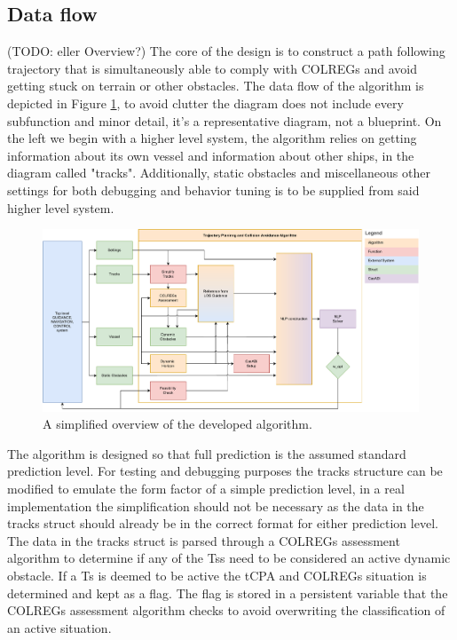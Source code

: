 \subsection{Data flow} (TODO: eller Overview?)
The core of the design is to construct a path following trajectory that is simultaneously able to comply with \gls{COLREGs} and avoid getting stuck
on terrain or other obstacles. The data flow of the algorithm is depicted in Figure \ref{FIG: Dataflow chart}, 
to avoid clutter the diagram does not include every subfunction and minor detail, it's a
representative diagram, not a blueprint. On the left we begin with a higher level system, the algorithm
relies on getting information about its own vessel and information about other ships, in the diagram called "tracks". Additionally,
static obstacles and miscellaneous other settings for both debugging and behavior tuning is to be supplied from said higher level system.

\begin{figure}[ht!]
    \includegraphics[width=\textwidth]{Images/SimpleSystem.pdf}
    \caption{A simplified overview of the developed algorithm.}
    \label{FIG: Dataflow chart}
\end{figure}

The algorithm is designed so that full prediction is the assumed standard prediction level. For testing and debugging purposes the tracks
structure can be modified to emulate the form factor of a simple prediction level, in a real implementation the simplification should not be necessary
as the data in the tracks struct should already be in the correct format for either prediction level.
The data in the tracks struct is parsed through a \gls{COLREGs} assessment algorithm to determine if any of the \gls{Ts}s need to be considered
an active dynamic obstacle. If a \gls{Ts} is deemed to be active the \gls{tCPA} and \gls{COLREGs} situation is determined and kept as a flag. The flag
is stored in a persistent variable that the \gls{COLREGs} assessment algorithm checks to avoid overwriting the classification of an active situation.

